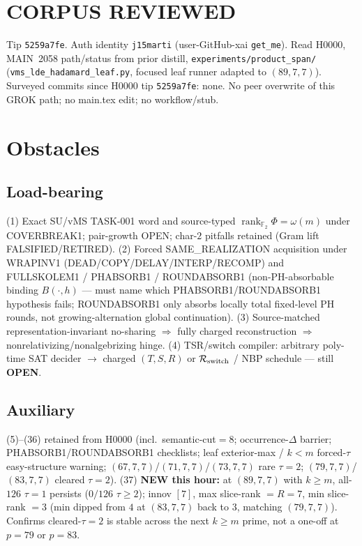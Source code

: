 \documentclass[11pt]{article}
\begin{document}
\section*{CORPUS REVIEWED}
Tip \texttt{5259a7fe}. Auth identity \texttt{j15marti} (user-GitHub-xai \texttt{get\_me}).
Read H0000, MAIN~2058 path/status from prior distill,
\texttt{experiments/product\_span/} (\texttt{vms\_lde\_hadamard\_leaf.py},
focused leaf runner adapted to $(89,7,7)$).
Surveyed commits since H0000 tip \texttt{5259a7fe}: none.
No peer overwrite of this GROK path; no main.tex edit; no workflow/stub.

\section*{Obstacles}
\subsection*{Load-bearing}
(1) Exact SU/vMS TASK-001 word and source-typed
$\operatorname{rank}_{\mathbb F_2}\Phi=\omega(m)$ under COVERBREAK1; pair-growth OPEN;
char-$2$ pitfalls retained (Gram lift FALSIFIED/RETIRED).
(2) Forced SAME\_REALIZATION acquisition under WRAPINV1
(DEAD/COPY/DELAY/INTERP/RECOMP) and FULLSKOLEM1 / PHABSORB1 / ROUNDABSORB1
(non-PH-absorbable binding $B(\cdot,h)$ --- must name which PHABSORB1/ROUNDABSORB1 hypothesis fails;
ROUNDABSORB1 only absorbs locally total fixed-level PH rounds, not growing-alternation global continuation).
(3) Source-matched representation-invariant no-sharing $\Rightarrow$ fully charged reconstruction
$\Rightarrow$ nonrelativizing/nonalgebrizing hinge.
(4) TSR/switch compiler: arbitrary poly-time SAT decider $\to$ charged $(T,S,R)$ or
$\mathcal R_{\rm switch}$ / NBP schedule --- still \textbf{OPEN}.

\subsection*{Auxiliary}
(5)--(36) retained from H0000 (incl.\ semantic-cut$=8$; occurrence-$\Delta$ barrier;
PHABSORB1/ROUNDABSORB1 checklists; leaf exterior-max / $k{<}m$ forced-$\tau$ easy-structure warning;
$(67,7,7)$/$(71,7,7)$/$(73,7,7)$ rare $\tau{=}2$; $(79,7,7)$/$(83,7,7)$ cleared $\tau{=}2$).
(37) \textbf{NEW this hour:} at $(89,7,7)$ with $k{\ge}m$, all-$126$ $\tau{=}1$ persists
($0/126$ $\tau{\ge}2$); innov $[7]$, max slice-rank $=R{=}7$, min slice-rank $=3$
(min dipped from $4$ at $(83,7,7)$ back to $3$, matching $(79,7,7)$). Confirms cleared-$\tau{=}2$
is stable across the next $k{\ge}m$ prime, not a one-off at $p{=}79$ or $p{=}83$.
\end{document}
